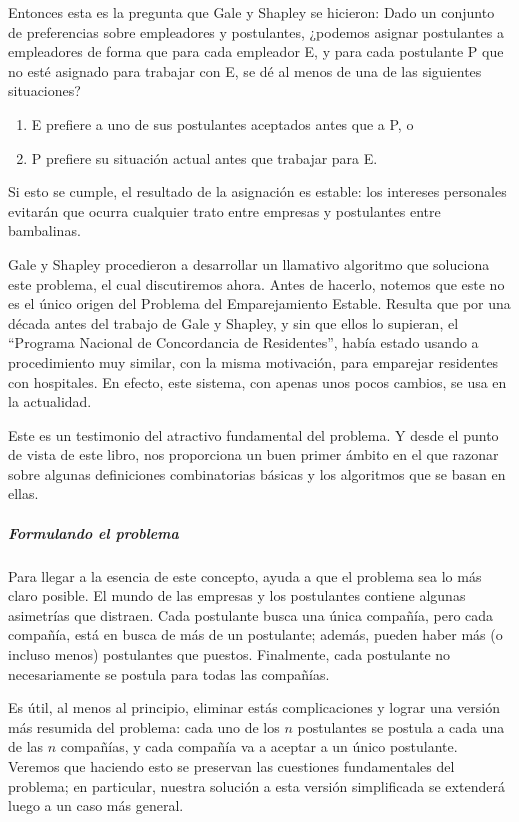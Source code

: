 \documentclass[a4paper, 12pt]{book}
\begin{document}
Entonces esta es la pregunta que Gale y Shapley se hicieron: Dado un conjunto de preferencias sobre empleadores y postulantes, ¿podemos asignar postulantes a empleadores de forma que para cada empleador E, y para cada postulante P que no esté asignado para trabajar con E, se dé al menos de una de las siguientes situaciones?

    \begin{enumerate}
       \item E prefiere a uno de sus postulantes aceptados antes que a P, o
       \item P prefiere su situación actual antes que trabajar para E.
    \end{enumerate}

Si esto se cumple, el resultado de la asignación es estable: los intereses personales evitarán que ocurra cualquier trato entre empresas y postulantes entre bambalinas.
	
Gale y Shapley procedieron a desarrollar un llamativo algoritmo que soluciona este problema, el cual discutiremos ahora. Antes de hacerlo, notemos que este no es el único origen del Problema del Emparejamiento Estable. Resulta que por una década antes del trabajo de Gale y Shapley, y sin que ellos lo supieran, el ``Programa Nacional de Concordancia de Residentes'', había estado usando a procedimiento muy similar, con la misma motivación, para emparejar residentes con hospitales. En efecto, este sistema, con apenas unos pocos cambios, se usa en la actualidad.

Este es un testimonio del atractivo fundamental del problema. Y desde el punto de vista de este libro, nos proporciona un buen primer ámbito en el que razonar sobre algunas definiciones combinatorias básicas y los algoritmos que se basan en ellas.

\subparagraph{Formulando el problema} Para llegar a la esencia de este concepto, ayuda a que el problema sea lo más claro posible. El mundo de las empresas y los postulantes contiene algunas asimetrías que distraen. Cada postulante busca una única compañía, pero cada compañía, está en busca de más de un postulante; además, pueden haber más (o incluso menos) postulantes que puestos. Finalmente, cada postulante no necesariamente se postula para todas las compañías.

Es útil, al menos al principio, eliminar estás complicaciones y lograr una versión más resumida del problema: cada uno de los $n$ postulantes se postula a cada una de las $n$ compañías, y cada compañía va a aceptar a un único postulante. Veremos que haciendo esto se preservan las cuestiones fundamentales del problema; en particular, nuestra solución a esta versión simplificada se extenderá luego a un caso más general.
\end{document}
